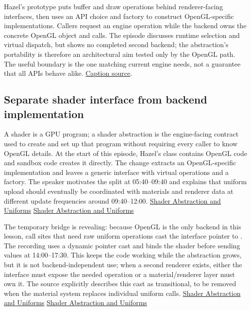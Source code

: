 Hazel's prototype puts buffer and draw operations behind renderer-facing interfaces, then uses an API choice and factory to construct OpenGL-specific implementations. Callers request an engine operation while the backend owns the concrete OpenGL object and calls. The episode discusses runtime selection and virtual dispatch, but shows no completed second backend; the abstraction's portability is therefore an architectural aim tested only by the OpenGL path. The useful boundary is the one matching current engine needs, not a guarantee that all APIs behave alike. \href{https://www.youtube.com/watch?v=BwCqRqqbB1Y}{Caption source}.

\subsection{Separate shader interface from backend implementation}\label{06-engine-ii-ch025-separate-shader-interface-from-backend-implementation}

\hypertarget{06-engine-ii-ch025-separate-shader-interface-from-backend-implementation}{}

A shader is a GPU program; a shader abstraction is the engine-facing contract used to create and set up that program without requiring every caller to know OpenGL details. At the start of this episode, Hazel's  class contains OpenGL code and sandbox code creates it directly. The change extracts an OpenGL-specific implementation and leaves a generic interface with virtual operations and a factory. The speaker motivates the split at 05:40--09:40 and explains that uniform upload should eventually be coordinated with materials and renderer data at different update frequencies around 09:40--12:00. \href{https://www.youtube.com/watch?v=d5wL6eZnWMU&t=340s}{Shader Abstraction and Uniforms} \href{https://www.youtube.com/watch?v=d5wL6eZnWMU&t=580s}{Shader Abstraction and Uniforms}

The temporary bridge is revealing: because OpenGL is the only backend in this lesson, call sites that need raw uniform operations cast the interface pointer to . The recording uses a dynamic pointer cast and binds the shader before sending values at 14:00--17:30. This keeps the code working while the abstraction grows, but it is not backend-independent use; when a second renderer exists, either the interface must expose the needed operation or a material/renderer layer must own it. The source explicitly describes this cast as transitional, to be removed when the material system replaces individual uniform calls. \href{https://www.youtube.com/watch?v=d5wL6eZnWMU&t=840s}{Shader Abstraction and Uniforms} \href{https://www.youtube.com/watch?v=d5wL6eZnWMU&t=960s}{Shader Abstraction and Uniforms}

